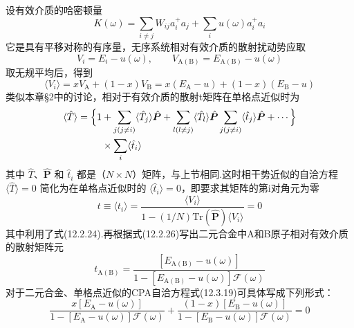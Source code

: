设有效介质的哈密顿量
\begin{equation}
  K\left(\omega\right)=\sum_{i\neq j}W_{ij}a_{i}^{+}a_{j}+\sum_{i}u\left(\omega\right)a_{i}^{+}a_{i}
\end{equation}
它是具有平移对称的有序量，无序系统相对有效介质的散射扰动势应取
\begin{equation}
  V_{i}=E_{i}-u\left(\omega\right),\qquad
  V_{\mathrm{A}(\mathrm{B})}=E_{\mathrm{A}(\mathrm{B})}-u\left(\omega\right)
\end{equation}
取无规平均后，得到
\begin{equation}
  \langle V_{i}\rangle=xV_{\mathrm{A}}+\left(1-x\right)V_{\mathrm{B}}
  =x\left(E_{\mathrm{A}}-u\right)+\left(1-x\right)\left(E_{\mathrm{B}}-u\right)
\end{equation}
类似本章§2中的讨论，相对于有效介质的散射t矩阵在单格点近似时为
\begin{equation}
\begin{aligned}
  \langle\hat{T}\rangle=\Bigl\{1&+\sum_{j(j\neq i)}\langle\hat{T}_{j}\rangle\hat{\boldsymbol{P}}
  +\sum_{l(l\neq j)}\langle\hat{T}_{l}\rangle\hat{\boldsymbol{P}}\sum_{j(j\neq i)}\langle\hat{t}_{j}\rangle\hat{\boldsymbol{P}}+\cdots\Bigr\}\\
  &\times\sum_{i}\langle\hat{t}_{i}\rangle
\end{aligned}
\end{equation}
其中 $\hat{T}$、$\hat{\boldsymbol{P}}$ 和 $\hat{t}_{i}$ 都是（$N\times N$）矩阵，与上节相同.这时相干势近似的自洽方程 $\langle\hat{T}\rangle=0$ 简化为在单格点近似时的 $\langle\hat{t}_{i}\rangle=0$，即要求其矩阵的第i对角元为零
\begin{equation}
  t\equiv\langle t_{i}\rangle=\frac{\langle V_{i}\rangle}
  {1-\left(1/N\right)\mathrm{Tr}\left(\hat{\boldsymbol{P}}\right)\langle V_{i}\rangle}=0
\end{equation}
其中利用了式(12.2.24).再根据式(12.2.26)写出二元合金中A和B原子相对有效介质的散射矩阵元
\begin{equation}
  t_{\mathrm{A}(\mathrm{B})}
  =\frac{\left[E_{\mathrm{A}(\mathrm{B})}-u\left(\omega\right)\right]}
  {1-\left[E_{\mathrm{A}(\mathrm{B})}-u\left(\omega\right)\right]\mathscr{F}\left(\omega\right)}
\end{equation}
对于二元合金、单格点近似的CPA自洽方程式(12.3.19)可具体写成下列形式：
\begin{equation}
  \frac{x\left[E_{\mathrm{A}}-u\left(\omega\right)\right]}
  {1-\left[E_{\mathrm{A}}-u\left(\omega\right)\right]\mathscr{F}\left(\omega\right)}
  +\frac{\left(1-x\right)\left[E_{\mathrm{B}}-u\left(\omega\right)\right]}
  {1-\left[E_{\mathrm{B}}-u\left(\omega\right)\right]\mathscr{F}\left(\omega\right)}=0
\end{equation}
